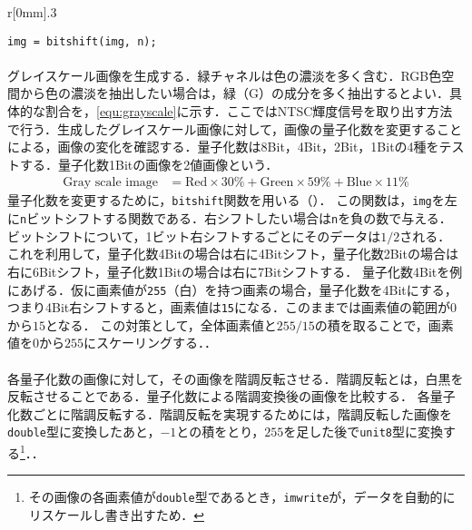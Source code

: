 \begin{wrapfigure}{r}[0mm]{.3\textwidth}
    \centering
    \vspace{-.7cm}
    \begin{lstlisting}[caption={\texttt{bitshift}関数},label={src:bitshift}]
img = bitshift(img, n);
    \end{lstlisting}
    \vspace{-.5cm}
\end{wrapfigure}
\paragraph{\kadaiab}
グレイスケール画像を生成する．緑チャネルは色の濃淡を多く含む．RGB色空間から色の濃淡を抽出したい場合は，緑（G）の成分を多く抽出するとよい．具体的な割合を，\eqref{equ:grayscale}に示す．ここではNTSC輝度信号を取り出す方法で行う．生成したグレイスケール画像に対して，画像の量子化数を変更することによる，画像の変化を確認する．量子化数は8Bit，4Bit，2Bit，1Bitの4種をテストする．量子化数1Bitの画像を2値画像という．
\begin{align}
    \textrm{Gray scale image} & = \textrm{Red}\times 30\% +\textrm{Green}\times 59\% +\textrm{Blue}\times 11\%\label{equ:grayscale}
\end{align}
量子化数を変更するために，\texttt{bitshift}関数を用いる（）．
この関数は，\texttt{img}を左に\texttt{n}ビットシフトする関数である．右シフトしたい場合は\texttt{n}を負の数で与える．
ビットシフトについて，1ビット右シフトするごとにそのデータは\(1/2\)される．
これを利用して，量子化数4Bitの場合は右に4Bitシフト，量子化数2Bitの場合は右に6Bitシフト，量子化数1Bitの場合は右に7Bitシフトする．
量子化数4Bitを例にあげる．仮に画素値が\texttt{255}（白）を持つ画素の場合，量子化数を4Bitにする，つまり4Bit右シフトすると，画素値は\texttt{15}になる．このままでは画素値の範囲が\(0\)から\(15\)となる．
この対策として，全体画素値と\(255/15\)の積を取ることで，画素値を\(0\)から\(255\)にスケーリングする．\scall{\kadaiab}．
\paragraph{\kadaiac}
各量子化数の画像に対して，その画像を階調反転させる．階調反転とは，白黒を反転させることである．量子化数による階調変換後の画像を比較する．
各量子化数ごとに階調反転する．階調反転を実現するためには，階調反転した画像を\texttt{double}型に変換したあと，\(-1\)との積をとり，\(255\)を足した後で\texttt{unit8}型に変換する\footnote{その画像の各画素値が\texttt{double}型であるとき，\texttt{imwrite}が，データを自動的にリスケールし書き出すため．}．\scall{\kadaiac}．

